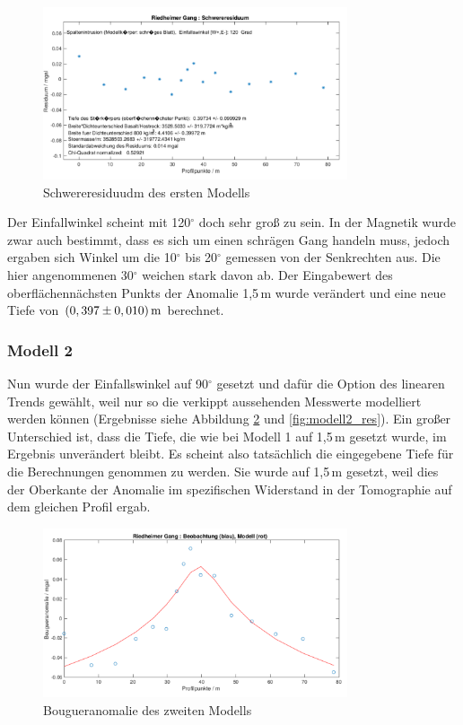 \begin{figure}[!ht]
 \centering
 \includegraphics[width=0.8\textwidth]{fig/modell1_res}
 \caption{Schwereresiduudm des ersten Modells}
 \label{fig:modell1_res}
\end{figure}

Der Einfallwinkel scheint mit 120$^\circ$ doch sehr groß zu sein. In der Magnetik wurde zwar auch bestimmt, dass es sich um einen schrägen Gang handeln muss, jedoch ergaben sich Winkel um die 10$^\circ$ bis 20$^\circ$ gemessen von der Senkrechten aus. Die hier angenommenen 30$^\circ$ weichen stark davon ab. Der Eingabewert des oberflächennächsten Punkts der Anomalie 1,5\,m wurde verändert und eine neue Tiefe von $(0,397\pm0,010)\,\mathrm{m}$ berechnet.

\subsubsection{Modell 2}

Nun wurde der Einfallswinkel auf 90$^\circ$ gesetzt und dafür die Option des linearen Trends gewählt, weil nur so die verkippt aussehenden Messwerte modelliert werden können (Ergebnisse siehe Abbildung \ref{fig:modell2} und \ref{fig:modell2_res}). Ein großer Unterschied ist, dass die Tiefe, die wie bei Modell 1 auf 1,5\,m gesetzt wurde, im Ergebnis unverändert bleibt. Es scheint also tatsächlich die eingegebene Tiefe für die Berechnungen genommen zu werden. Sie wurde auf 1,5\,m gesetzt, weil dies der Oberkante der Anomalie im spezifischen Widerstand in der Tomographie auf dem gleichen Profil ergab.

\begin{figure}[!ht]
 \centering
 \includegraphics[width=0.8\textwidth]{fig/modell2}
 \caption{Bougueranomalie des zweiten Modells}
 \label{fig:modell2}
\end{figure}

